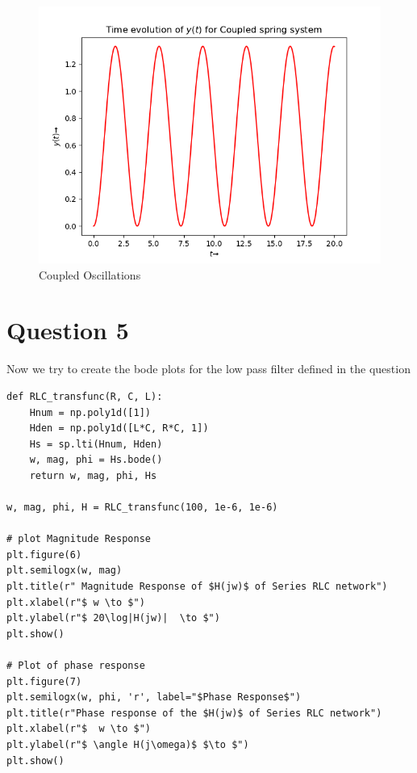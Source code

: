\documentclass{article}
\begin{document}
\begin{figure}[h!]
\includegraphics[scale=0.7]{fig9_6.png}
\caption{Coupled Oscillations }
\label{fig:Coupled Oscillations}
\end{figure}
\clearpage
\section*{Question 5}

Now we try to create the bode plots for the low pass filter defined in the question
\begin{verbatim}
def RLC_transfunc(R, C, L):
    Hnum = np.poly1d([1])
    Hden = np.poly1d([L*C, R*C, 1])
    Hs = sp.lti(Hnum, Hden)
    w, mag, phi = Hs.bode()
    return w, mag, phi, Hs

w, mag, phi, H = RLC_transfunc(100, 1e-6, 1e-6)

# plot Magnitude Response
plt.figure(6)
plt.semilogx(w, mag)
plt.title(r" Magnitude Response of $H(jw)$ of Series RLC network")
plt.xlabel(r"$ w \to $")
plt.ylabel(r"$ 20\log|H(jw)|  \to $")
plt.show()

# Plot of phase response
plt.figure(7)
plt.semilogx(w, phi, 'r', label="$Phase Response$")
plt.title(r"Phase response of the $H(jw)$ of Series RLC network")
plt.xlabel(r"$  w \to $")
plt.ylabel(r"$ \angle H(j\omega)$ $\to $")
plt.show()
\end{verbatim}
\end{document}
